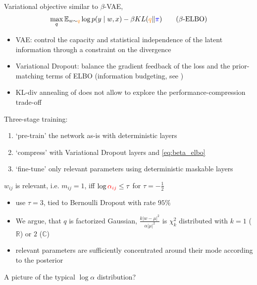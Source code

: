 \documentclass{beamer}
\newcommand{\real}{\mathbb{R}}
\newcommand{\cplx}{\mathbb{C}}
\begin{document}
\begin{frame}[c]{\insertsection}
  Variational objective similar to $\beta$-VAE, \citep{higgins_beta-vae_2017}
  \begin{equation}
  \label{eq:beta_elbo}
    \max_q
    \mathbb{E}_{w \sim {\color{orange} q}}
      \log p(y\mid w, x)  %
    - \beta KL({\color{orange} q}\|{\color{blue} \pi})
    \tag{$\beta$-ELBO}
  \end{equation}
  \begin{itemize}
    \item VAE: control the capacity and statistical independence of the latent
    information through a constraint on the divergence
    \item Variational Dropout: balance the gradient feedback of the loss and the
    prior-matching terms of ELBO (information budgeting, see \citep{BitsBack})
    \item KL-div annealing of \citet{molchanov_variational_2017} does not allow
    to explore the performance-compression trade-off
  \end{itemize}
\end{frame}

\begin{frame}[c]{\insertsection}
  Three-stage training:
  \begin{enumerate}
    \item `pre-train' the network as-is with deterministic layers
    \item `compress' with Variational Dropout layers and \eqref{eq:beta_elbo}
    \item `fine-tune' only relevant parameters using deterministic maskable layers
  \end{enumerate}

  \medskip
  $w_{ij}$ is relevant, i.e. $m_{ij} = 1$, iff $
    \log{{\color{red} \alpha_{ij}}} \leq \tau
  $ for $\tau = -\tfrac12$
  \begin{itemize}
    \item \citet{molchanov_variational_2017,kingma_variational_2015} use $\tau=3$,
      tied to Bernoulli Dropout with rate $95\%$
    \item We argue, that $q$ is factorized Gaussian, $
        \tfrac{k \lvert w - \mu \rvert^2}
              {\alpha \lvert \mu \rvert^2}
      $ is $\chi^2_k$ distributed with $k=1$ ($\real$) or $2$ ($\cplx$)
    \item relevant parameters are sufficiently concentrated around their mode according
    to the posterior
  \end{itemize}

  A picture of the typical $\log \alpha$ distribution?
\end{frame}
\end{document}
